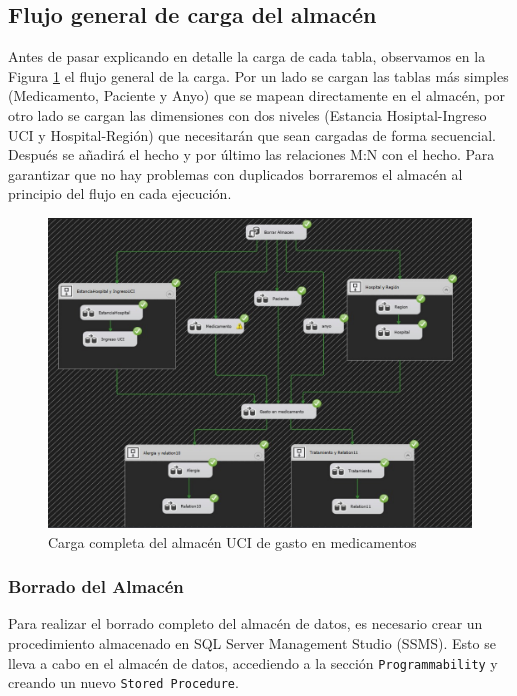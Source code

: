 \documentclass{article}
\begin{document}
	\subsection{Flujo general de carga del almacén}
	Antes de pasar explicando en detalle la carga de cada tabla, observamos en la Figura \ref{fig:flujo_general} el flujo general de la carga. Por un lado se cargan las tablas más simples (Medicamento, Paciente y Anyo) que se mapean directamente en el almacén, por otro lado se cargan las dimensiones con dos niveles (Estancia Hosiptal-Ingreso UCI y Hospital-Región) que necesitarán que sean cargadas de forma secuencial. Después se añadirá el hecho y por último las relaciones M:N con el hecho. Para garantizar que no hay problemas con duplicados borraremos el almacén al principio del flujo en cada ejecución.
	\begin{figure}[H]
		\centering
		\label{fig:flujo_general}
		\includegraphics[width=\linewidth]{./images/completados/flujo_completo_uci.jpeg}
		\caption{Carga completa del almacén UCI de gasto en medicamentos}
	\end{figure}
	\subsubsection{Borrado del Almacén}
	
	Para realizar el borrado completo del almacén de datos, es necesario crear un procedimiento almacenado en SQL Server Management Studio (SSMS). Esto se lleva a cabo en el almacén de datos, accediendo a la sección \texttt{Programmability} y creando un nuevo \texttt{Stored Procedure}. \\
	
\end{document}
